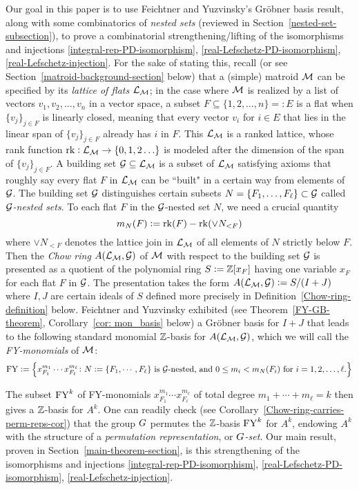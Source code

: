 Our goal in this paper is to use  Feichtner and Yuzvinsky's Gr\"obner basis result, along with some combinatorics of {\it nested sets} (reviewed in Section~\ref{nested-set-subsection}), to prove a combinatorial strengthening/lifting of the isomorphisms and injections \eqref{integral-rep-PD-isomorphism}, \eqref{real-Lefschetz-PD-isomorphism}, \eqref{real-Lefschetz-injection}.  For the sake of stating this, recall (or see Section~\ref{matroid-background-section} below) that a (simple) matroid $\mathcal{M}$ can be specified by
its {\it lattice of flats} $\mathcal{L}_{\mathcal{M}}$;  in the case where $\mathcal{M}$ is realized by
a list of vectors $v_1,v_2,\ldots,v_n$ in a vector space, a subset $F \subseteq \{1,2,\ldots,n\}=:E$ is a flat when  $\{v_j\}_{j \in F}$ is linearly closed, meaning that every vector $v_i$ for $i\in E$ that lies in the linear span of $\{v_j\}_{j \in F}$ already has $i$ in $F$.
This $\mathcal{L}_{\mathcal{M}}$ is a ranked lattice, whose rank function $\operatorname{\mathrm{rk}}: \mathcal{L}_{\mathcal{M}} \rightarrow \{0,1,2\ldots\}$ is modeled after the dimension of the span of $\{v_j\}_{j \in F}$. A building set $\mathcal{G} \subseteq \mathcal{L}_{\mathcal{M}}$ is a subset of $\mathcal{L}_{\mathcal{M}}$ satisfying axioms that roughly say every flat $F$ in $\mathcal{L}_{\mathcal{M}}$ can be ``built" in a certain way from elements of $\mathcal{G}$.
The building set $\mathcal{G}$ distinguishes certain subsets $N=\{F_1,\ldots,F_\ell\} \subset \mathcal{G}$ called {\it $\mathcal{G}$-nested sets}.
To each flat $F$ in the $\mathcal{G}$-nested set $N$, we need a crucial quantity
\begin{equation}
\label{crucial-quantity}
m_N(F):=\operatorname{\mathrm{rk}}(F) - \operatorname{\mathrm{rk}}(\vee N_{<F})
\end{equation}
where $\vee  N_{<F}$ denotes the lattice join in $\mathcal{L}_{\mathcal{M}}$ of all elements of $N$ strictly
below $F$.
Then the \emph{Chow ring} $A(\mathcal{L}_{\mathcal{M}}, \mathcal{G})$ of $\mathcal{M}$ with respect to the building set $\mathcal{G}$
is presented as a quotient of the
polynomial ring $S:=\mathbb{Z}[x_F]$ having one variable $x_F$ for each flat $F$ in $\mathcal{G}$.  The presentation takes the form 
$
A(\mathcal{L}_{\mathcal{M}}, \mathcal{G}) := S / (I + J)
$
where $I ,J$ are certain ideals of $S$ defined more precisely in Definition~\ref{Chow-ring-definition} below.
Feichtner and Yuzvinsky exhibited (see Theorem~\ref{FY-GB-theorem}, Corollary~\ref{cor: mon_basis} below) a Gr\"obner basis for $I + J$ that leads to the following standard monomial $\mathbb{Z}$-basis for $A(\mathcal{L}_{\mathcal{M}}, \mathcal{G})$,
which we will call the {\it FY-monomials} of $\mathcal{M}$:
$$
\mathrm{FY}:=\left\{x_{F_1}^{m_1}  \cdots x_{F_\ell}^{m_\ell} \colon
N:=\{F_1, \cdots,  F_\ell\} \text{ is } \mathcal{G}\text{-nested, and } 
0 \leq m_i < m_N(F_i) \text{ for }i=1,2,\ldots,\ell.\right\}
$$


The subset $\mathrm{FY}^k$ of FY-monomials $x_{F_1}^{m_1} \cdots x_{F_\ell}^{m_\ell}$ of total degree $m_1+\cdots+m_\ell=k$ then gives a $\mathbb{Z}$-basis for $A^k$.
One can readily check
(see Corollary~\ref{Chow-ring-carries-perm-reps-cor}) that the group $G$ permutes the $\mathbb{Z}$-basis $\mathrm{FY}^k$ for $A^k$, 
endowing $A^k$ with the structure of
a {\it permutation representation}, or {\it $G$-set}.  
Our main result, proven in Section~\ref{main-theorem-section}, is this strengthening of the isomorphisms and injections \eqref{integral-rep-PD-isomorphism}, \eqref{real-Lefschetz-PD-isomorphism}, \eqref{real-Lefschetz-injection}.


